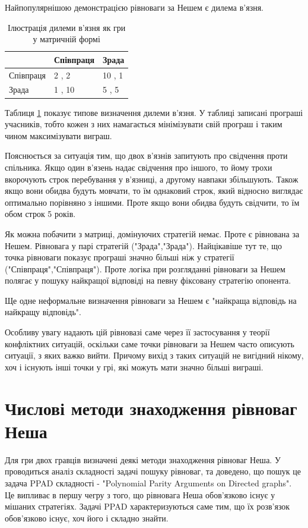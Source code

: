 Найпопулярнішою демонстрацією рівноваги за Нешем є дилема в'язня.

\begin{table}[H]
	\centering
	\label{table:prisoners_dillema}
	\caption{Ілюстрація дилеми в'язня як гри у матричній формі}
	\begin{tabular}{|l|l|l|}
		\hline
					& Співпраця & Зрада
		\\ \hline
		Співпраця 	& 2 , 2     & 10 , 1
		\\ \hline
		Зрада 		& 1 , 10    & 5 , 5
		\\ \hline
	\end{tabular}
\end{table}

Таблиця \ref{table:prisoners_dillema} показує типове визначення дилеми в'язня. У таблиці записані програші учасників, тобто кожен з них намагається мінімізувати свій програш і таким чином максимізувати виграш.

Пояснюється за ситуація тим, що двох в'язнів запитують про свідчення проти спільника. Якщо один в'язень надає свідчення про іншого, то йому трохи вкорочують строк перебування у в'язниці, а другому навпаки збільшують. Також якщо вони обидва будуть мовчати, то їм однаковий строк, який відносно виглядає оптимально порівняно з іншими. Проте якщо вони обидва будуть свідчити, то їм обом строк 5 років.

Як можна побачити з матриці, домінуючих стратегій немає. Проте є рівнована за Нешем. Рівновага у парі стратегій ("Зрада","Зрада"). Найцікавіше тут те, що точка рівноваги показує програші значно більші ніж у стратегії ("Співпраця","Співпраця"). Проте логіка при розгляданні рівноваги за Нешем полягає у пошуку найкращої відповіді на певну фіксовану стратегію опонента.

Ще одне неформальне визначення рівноваги за Нешем є "найкраща відповідь на найкращу відповідь".

Особливу увагу надають цій рівновазі саме через її застосування у теорії конфліктних ситуацій, оскільки саме точки рівноваги за Нешем часто описують ситуації, з яких важко вийти. Причому вихід з таких ситуацій не вигідний нікому, хоч і існують інші точки у грі, які можуть мати значно більші виграші.

\section{Числові методи знаходження рівноваг Неша}

Для гри двох гравців визначені деякі методи знаходження рівноваг Неша. У \cite{NashComplexity} проводиться аналіз складності задачі пошуку рівноваг, та доведено, що пошук це задача PPAD складності - "Polynomial Parity Arguments on Directed graphs". Це випливає в першу чегру з того, що рівновага Неша обов'язково існує у мішаних стратегіях. Задачі PPAD характеризуються саме тим, що їх розв'язок обов'язково існує, хоч його і складно знайти.

